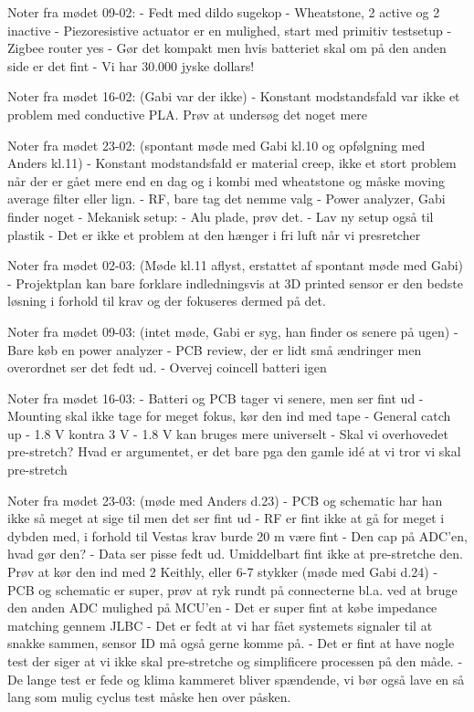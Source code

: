Noter fra mødet 09-02:
- Fedt med dildo sugekop
- Wheatstone, 2 active og 2 inactive
- Piezoresistive actuator er en mulighed, start med primitiv testsetup
- Zigbee router yes
- Gør det kompakt men hvis batteriet skal om på den anden side er det fint
- Vi har 30.000 jyske dollars!

Noter fra mødet 16-02:
(Gabi var der ikke)
- Konstant modstandsfald var ikke et problem med conductive PLA. Prøv at undersøg det noget mere

Noter fra mødet 23-02:
(spontant møde med Gabi kl.10 og opfølgning med Anders kl.11)
- Konstant modstandsfald er material creep, ikke et stort problem når der er gået mere end en dag   og i kombi med wheatstone og måske moving average filter eller lign.
- RF, bare tag det nemme valg
- Power analyzer, Gabi finder noget
- Mekanisk setup:
    - Alu plade, prøv det.
    - Lav ny setup også til plastik
    - Det er ikke et problem at den hænger i fri luft når vi presretcher

Noter fra mødet 02-03:
(Møde kl.11 aflyst, erstattet af spontant møde med Gabi)
- Projektplan kan bare forklare indledningsvis at 3D printed sensor er den bedste løsning i         forhold til krav og der fokuseres dermed på det.

Noter fra mødet 09-03:
(intet møde, Gabi er syg, han finder os senere på ugen)
- Bare køb en power analyzer
- PCB review, der er lidt små ændringer men overordnet ser det fedt ud.
- Overvej coincell batteri igen

Noter fra mødet 16-03:
- Batteri og PCB tager vi senere, men ser fint ud
- Mounting skal ikke tage for meget fokus, kør den ind med tape
- General catch up
- 1.8 V kontra 3 V
    - 1.8 V kan bruges mere universelt
- Skal vi overhovedet pre-stretch? Hvad er argumentet, er det bare pga den gamle idé at vi tror     vi skal pre-stretch

Noter fra mødet 23-03:
(møde med Anders d.23)
- PCB og schematic har han ikke så meget at sige til men det ser fint ud
    - RF er fint ikke at gå for meget i dybden med, i forhold til Vestas krav burde 20 m være fint
    - Den cap på ADC'en, hvad gør den?
- Data ser pisse fedt ud. Umiddelbart fint ikke at pre-stretche den. Prøv at kør den ind med 2      Keithly, eller 6-7 stykker
(møde med Gabi d.24)
- PCB og schematic er super, prøv at ryk rundt på connecterne bl.a. ved at bruge den anden ADC      mulighed på MCU'en
- Det er super fint at købe impedance matching gennem JLBC
- Det er fedt at vi har fået systemets signaler til at snakke sammen, sensor ID må også gerne       komme på.
- Det er fint at have nogle test der siger at vi ikke skal pre-stretche og simplificere processen   på den måde.
- De lange test er fede og klima kammeret bliver spændende, vi bør også lave en så lang som mulig   cyclus test måske hen over påsken.

